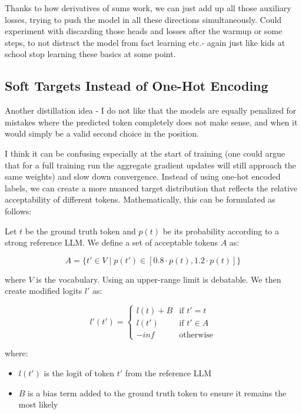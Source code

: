 \documentclass[10pt]{article}
\begin{document}
Thanks to how derivatives of sums work, we can just add up all those auxiliary losses, trying to push the model in all these directions simultaneously. Could experiment with discarding those heads and losses after the warmup or some steps, to not distract the model from fact learning etc.- again just like kids at school stop learning these basics at some point.

\subsection{Soft Targets Instead of One-Hot Encoding}

Another distillation idea - I do not like that the models are equally penalized for mistakes where the predicted token completely does not make sense, and when it would simply be a valid second choice in the position.

I think it can be confusing especially at the start of training (one could argue that for a full training run the aggregate gradient updates will still approach the same weights) and slow down convergence. Instead of using one-hot encoded labels, we can create a more nuanced target distribution that reflects the relative acceptability of different tokens. Mathematically, this can be formulated as follows:

Let $t$ be the ground truth token and $p(t)$ be its probability according to a strong reference LLM. We define a set of acceptable tokens $A$ as:

\begin{equation}
A = \{t' \in V \mid p(t') \in [0.8 \cdot p(t), 1.2 \cdot p(t)]\}
\end{equation}

where $V$ is the vocabulary. Using an upper-range limit is debatable. We then create modified logits $l'$ as:

\begin{equation}
l'(t') =
\begin{cases}
l(t) + B & \text{if } t' = t\\
l(t') & \text{if } t' \in A \\
-inf & \text{otherwise}
\end{cases}
\end{equation}

where:
\begin{itemize}[leftmargin=*,itemsep=0pt,topsep=0pt,parsep=0pt]
    \item $l(t')$ is the logit of token $t'$ from the reference LLM
    \item $B$ is a bias term added to the ground truth token to ensure it remains the most likely
\end{itemize}
\end{document}

